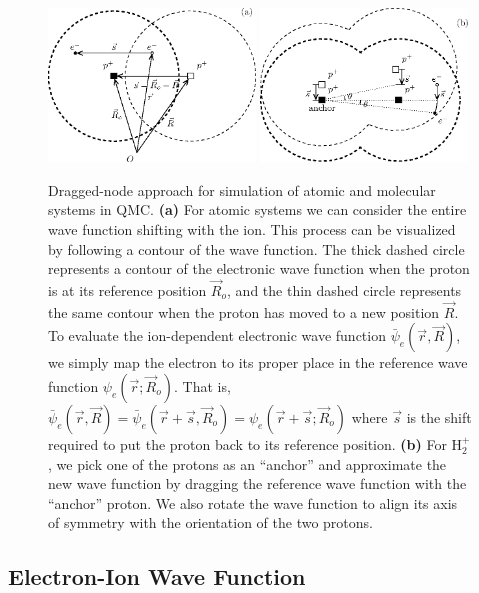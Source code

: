 \begin{figure}[h]
\includegraphics[width=0.49\textwidth]{fig1a}
\includegraphics[width=0.49\textwidth]{fig1b}
\caption{Dragged-node approach for simulation of atomic and molecular systems in QMC. {\bf (a)} For atomic systems we can consider the entire wave function shifting with the ion. This process can be visualized by following a contour of the wave function. The thick dashed circle represents a contour of the electronic wave function when the proton is at its reference position $\vec{R}_o$, and the thin dashed circle represents the same contour when the proton has moved to a new position $\vec{R}$. To evaluate the ion-dependent electronic wave function $\bar{\psi}_e(\vec{r},\vec{R})$, we simply map the electron to its proper place in the reference wave function $\psi_e(\vec{r};\vec{R}_o)$. That is, $\bar{\psi}_e(\vec{r},\vec{R})=\bar{\psi}_e(\vec{r}+\vec{s},\vec{R}_o)=\psi_e(\vec{r}+\vec{s};\vec{R}_o)$ where $\vec{s}$ is the shift required to put the proton back to its reference position. {\bf (b)} For H$_2^+$, we pick one of the protons as an ``anchor'' and approximate the new wave function by dragging the reference wave function with the ``anchor'' proton. We also rotate the wave function to align its axis of symmetry with the orientation of the two protons. \label{fig:drag}}
\end{figure}

\subsection{Electron-Ion Wave Function}

